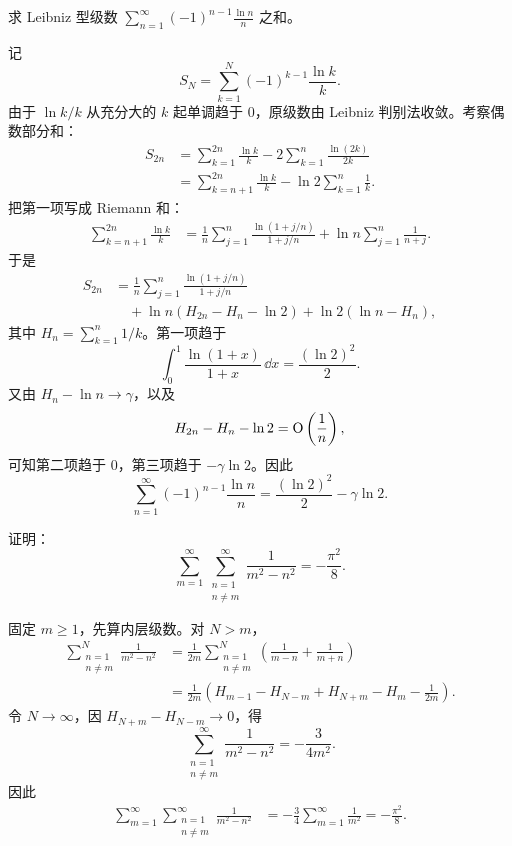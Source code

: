 \begin{xreferenceproblem}[2]
求 Leibniz 型级数 $\displaystyle\sum_{n=1}^{\infty}(-1)^{n-1}\frac{\ln n}{n}$ 之和。
\end{xreferenceproblem}
\begin{xsolution}
记
\[
  S_N=\sum_{k=1}^{N}(-1)^{k-1}\frac{\ln k}{k}.
\]
由于 $\ln k/k$ 从充分大的 $k$ 起单调趋于 $0$，原级数由 Leibniz 判别法收敛。考察偶数部分和：
\[
\begin{aligned}
  S_{2n}
  &=\sum_{k=1}^{2n}\frac{\ln k}{k}
    -2\sum_{k=1}^{n}\frac{\ln(2k)}{2k}\\
  &=\sum_{k=n+1}^{2n}\frac{\ln k}{k}
    -\ln2\sum_{k=1}^{n}\frac1k.
\end{aligned}
\]
把第一项写成 Riemann 和：
\[
\begin{aligned}
  \sum_{k=n+1}^{2n}\frac{\ln k}{k}
  &=\frac1n\sum_{j=1}^{n}
    \frac{\ln(1+j/n)}{1+j/n}
    +\ln n\sum_{j=1}^{n}\frac1{n+j}.
\end{aligned}
\]
于是
\[
\begin{aligned}
  S_{2n}
  &=\frac1n\sum_{j=1}^{n}
    \frac{\ln(1+j/n)}{1+j/n}\\
  &\quad+\ln n\left(H_{2n}-H_n-\ln2\right)
    +\ln2\left(\ln n-H_n\right),
\end{aligned}
\]
其中 $H_n=\sum_{k=1}^n1/k$。第一项趋于
\[
  \int_0^1\frac{\ln(1+x)}{1+x}\,\dd x
  =\frac{(\ln2)^2}{2}.
\]
又由 $H_n-\ln n\to\gamma$，以及
\[
  H_{2n}-H_n-\ln2=\mathrm{O}\left(\frac1n\right),
\]
可知第二项趋于 $0$，第三项趋于 $-\gamma\ln2$。因此
\[
  \boxed{\displaystyle
  \sum_{n=1}^{\infty}(-1)^{n-1}\frac{\ln n}{n}
  =\frac{(\ln2)^2}{2}-\gamma\ln2 }.
\]
\end{xsolution}


\begin{xreferenceproblem}[3]
证明：
\[
  \sum_{m=1}^{\infty}\sum_{\substack{n=1\\n\ne m}}^{\infty}\frac1{m^2-n^2}=-\frac{\pi^2}{8}.
\]
\end{xreferenceproblem}
\begin{xsolution}
固定 $m\geqslant1$，先算内层级数。对 $N>m$，
\[
\begin{aligned}
\sum_{\substack{n=1\\n\ne m}}^N\frac1{m^2-n^2}
&=\frac1{2m}\sum_{\substack{n=1\\n\ne m}}^N
 \left(\frac1{m-n}+\frac1{m+n}\right)\\
&=\frac1{2m}\left(
H_{m-1}-H_{N-m}+H_{N+m}-H_m-\frac1{2m}
\right).
\end{aligned}
\]
令 $N\to\infty$，因 $H_{N+m}-H_{N-m}\to0$，得
\[
  \sum_{\substack{n=1\\n\ne m}}^{\infty}\frac1{m^2-n^2}
  =-\frac3{4m^2}.
\]
因此
\[
\begin{aligned}
  \sum_{m=1}^{\infty}\sum_{\substack{n=1\\n\ne m}}^{\infty}
  \frac1{m^2-n^2}
  &=-\frac34\sum_{m=1}^{\infty}\frac1{m^2}
  =-\frac{\pi^2}{8}.
\end{aligned}
\]
\end{xsolution}


